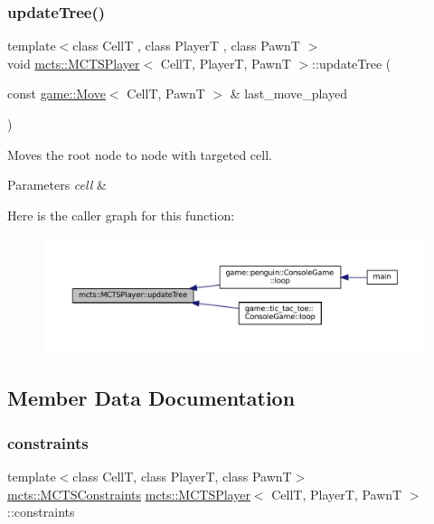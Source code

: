 \subsubsection{\texorpdfstring{update\+Tree()}{updateTree()}}
{\footnotesize\ttfamily template$<$class CellT , class PlayerT , class PawnT $>$ \\
void \hyperlink{classmcts_1_1_m_c_t_s_player}{mcts\+::\+M\+C\+T\+S\+Player}$<$ CellT, PlayerT, PawnT $>$\+::update\+Tree (\begin{DoxyParamCaption}\item[{const \hyperlink{structgame_1_1_move}{game\+::\+Move}$<$ CellT, PawnT $>$ \&}]{last\+\_\+move\+\_\+played }\end{DoxyParamCaption})}



Moves the root node to node with targeted cell. 


\begin{DoxyParams}{Parameters}
{\em cell} & \\
\hline
\end{DoxyParams}
Here is the caller graph for this function\+:
\nopagebreak
\begin{figure}[H]
\begin{center}
\leavevmode
\includegraphics[width=350pt]{classmcts_1_1_m_c_t_s_player_a02d0a6f2219decabb51ff9d8c4c9b355_icgraph}
\end{center}
\end{figure}


\subsection{Member Data Documentation}
\mbox{\label{classmcts_1_1_m_c_t_s_player_a58cb7a7b1286e635d548ebe0405d79e6}} 
\subsubsection{\texorpdfstring{constraints}{constraints}}
{\footnotesize\ttfamily template$<$class CellT, class PlayerT, class PawnT$>$ \\
\hyperlink{structmcts_1_1_m_c_t_s_constraints}{mcts\+::\+M\+C\+T\+S\+Constraints} \hyperlink{classmcts_1_1_m_c_t_s_player}{mcts\+::\+M\+C\+T\+S\+Player}$<$ CellT, PlayerT, PawnT $>$\+::constraints\hspace{0.3cm}{\ttfamily [protected]}}




